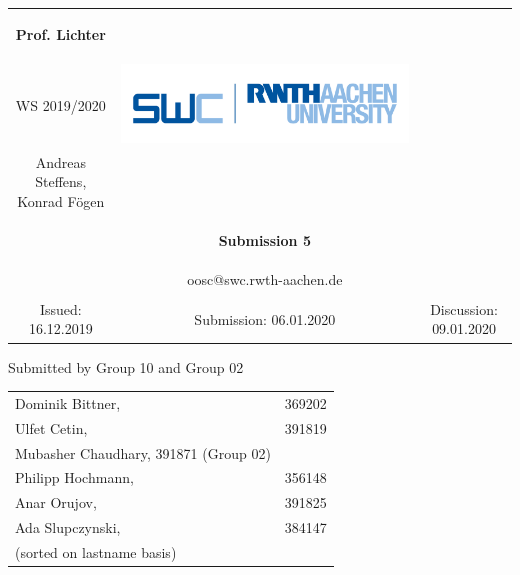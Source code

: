 \begin{tabular}{ccc}
		\begin{large} \textbf{Prof. Lichter} \end{large} &
		
		\begin{minipage}[H]{3.5cm}
			\centering
			\begin{large} OOSC \end{large} \\
			\begin{large} WS 2019/2020 \end{large}
		\end{minipage} &
		
		\begin{minipage}[H]{4cm}
			\includegraphics[keepaspectratio,width=\textwidth,angle=0]{images/swc.png}
		\end{minipage} \\
		Andreas Steffens, Konrad F\"ogen &  &  \\
		& \begin{huge} \textbf{Submission 5} \end{huge}&  \\
		& oosc@swc.rwth-aachen.de &  \\
		& & \\
		Issued: 16.12.2019 &
		Submission: 06.01.2020 &
		Discussion: 09.01.2020 \\
	\end{tabular}
	\newline \newline \newline
	\begin{center}
		Submitted by Group 10 and Group 02
		
		\begin{tabular}{ll}
			Dominik Bittner, & 369202 \\
			Ulfet Cetin, & 391819\\
			Mubasher Chaudhary, 391871 (Group 02)& \\
			Philipp Hochmann, & 356148 \\
			Anar Orujov, & 391825\\
			Ada Slupczynski, & 384147\\
			(sorted on lastname basis)
		\end{tabular}
	\end{center}
